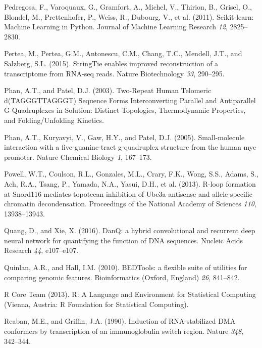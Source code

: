 \documentclass[12pt,a4paper,]{report}
\begin{document}
\leavevmode\hypertarget{ref-Pedregosa2011}{}%
Pedregosa, F., Varoquaux, G., Gramfort, A., Michel, V., Thirion, B.,
Grisel, O., Blondel, M., Prettenhofer, P., Weiss, R., Dubourg, V., et
al. (2011). Scikit-learn: Machine Learning in Python. Journal of Machine
Learning Research \emph{12}, 2825--2830.

\leavevmode\hypertarget{ref-Pertea2015}{}%
Pertea, M., Pertea, G.M., Antonescu, C.M., Chang, T.C., Mendell, J.T.,
and Salzberg, S.L. (2015). StringTie enables improved reconstruction of
a transcriptome from RNA-seq reads. Nature Biotechnology \emph{33},
290--295.

\leavevmode\hypertarget{ref-Phan2003}{}%
Phan, A.T., and Patel, D.J. (2003). Two-Repeat Human Telomeric
d(TAGGGTTAGGGT) Sequence Forms Interconverting Parallel and Antiparallel
G-Quadruplexes in Solution: Distinct Topologies, Thermodynamic
Properties, and Folding/Unfolding Kinetics.

\leavevmode\hypertarget{ref-Phan2005}{}%
Phan, A.T., Kuryavyi, V., Gaw, H.Y., and Patel, D.J. (2005).
Small-molecule interaction with a five-guanine-tract g-quadruplex
structure from the human myc promoter. Nature Chemical Biology \emph{1},
167--173.

\leavevmode\hypertarget{ref-Powell2013}{}%
Powell, W.T., Coulson, R.L., Gonzales, M.L., Crary, F.K., Wong, S.S.,
Adams, S., Ach, R.A., Tsang, P., Yamada, N.A., Yasui, D.H., et al.
(2013). R-loop formation at Snord116 mediates topotecan inhibition of
Ube3a-antisense and allele-specific chromatin decondensation.
Proceedings of the National Academy of Sciences \emph{110},
13938--13943.

\leavevmode\hypertarget{ref-Quang2016}{}%
Quang, D., and Xie, X. (2016). DanQ: a hybrid convolutional and
recurrent deep neural network for quantifying the function of DNA
sequences. Nucleic Acids Research \emph{44}, e107--e107.

\leavevmode\hypertarget{ref-Quinlan2010}{}%
Quinlan, A.R., and Hall, I.M. (2010). BEDTools: a flexible suite of
utilities for comparing genomic features. Bioinformatics (Oxford,
England) \emph{26}, 841--842.

\leavevmode\hypertarget{ref-RCoreTeam2013}{}%
R Core Team (2013). R: A Language and Environment for Statistical
Computing (Vienna, Austria: R Foundation for Statistical Computing).

\leavevmode\hypertarget{ref-Reaban1990}{}%
Reaban, M.E., and Griffin, J.A. (1990). Induction of RNA-stabilized DMA
conformers by transcription of an immunoglobulin switch region. Nature
\emph{348}, 342--344.
\end{document}
